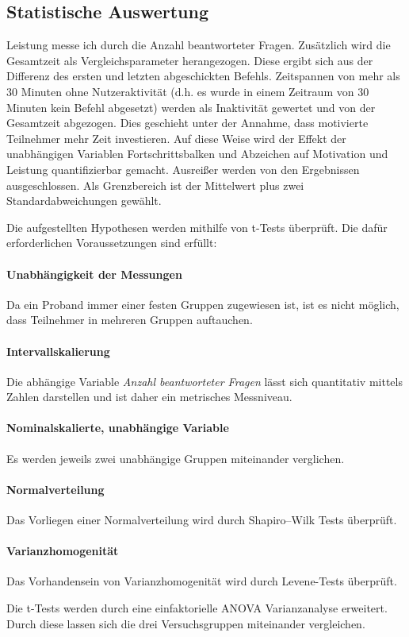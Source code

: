 \subsection{Statistische Auswertung}
Leistung messe ich durch die Anzahl beantworteter Fragen. Zusätzlich wird die Gesamtzeit als Vergleichsparameter herangezogen. Diese ergibt sich aus der Differenz des ersten und letzten abgeschickten Befehls. Zeitspannen von mehr als 30 Minuten ohne Nutzeraktivität (d.h. es wurde in einem Zeitraum von 30 Minuten kein Befehl abgesetzt) werden als Inaktivität gewertet und von der Gesamtzeit abgezogen. Dies geschieht unter der Annahme, dass motivierte Teilnehmer mehr Zeit investieren. Auf diese Weise wird der Effekt der unabhängigen Variablen Fortschrittsbalken und Abzeichen auf Motivation und Leistung quantifizierbar gemacht. Ausreißer werden von den Ergebnissen ausgeschlossen. Als Grenzbereich ist der Mittelwert plus zwei Standardabweichungen gewählt.

Die aufgestellten Hypothesen werden mithilfe von t-Tests überprüft. Die dafür erforderlichen Voraussetzungen sind erfüllt:

\paragraph{Unabhängigkeit der Messungen}
Da ein Proband immer einer festen Gruppen zugewiesen ist, ist es nicht möglich, dass Teilnehmer in mehreren Gruppen auftauchen.

\paragraph{Intervallskalierung}
Die abhängige Variable \textit{Anzahl beantworteter Fragen} lässt sich quantitativ mittels Zahlen darstellen und ist daher ein metrisches Messniveau.

\paragraph{Nominalskalierte, unabhängige Variable}
Es werden jeweils zwei unabhängige Gruppen miteinander verglichen.

\paragraph{Normalverteilung}
Das Vorliegen einer Normalverteilung wird durch Shapiro–Wilk Tests überprüft.

\paragraph{Varianzhomogenität}
Das Vorhandensein von Varianzhomogenität wird durch Levene-Tests überprüft.

Die t-Tests werden durch eine einfaktorielle ANOVA Varianzanalyse erweitert. Durch diese lassen sich die drei Versuchsgruppen miteinander vergleichen.

